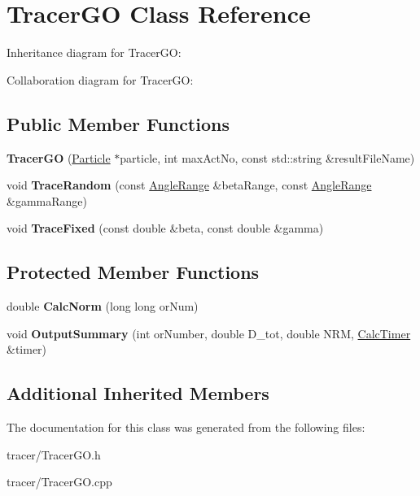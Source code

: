 \hypertarget{class_tracer_g_o}{}\section{Tracer\+GO Class Reference}
\label{class_tracer_g_o}


Inheritance diagram for Tracer\+GO\+:


Collaboration diagram for Tracer\+GO\+:
\subsection*{Public Member Functions}
\begin{DoxyCompactItemize}
\item 
\mbox{\label{class_tracer_g_o_abe9530e32399e92b297868a133787109}} 
{\bfseries Tracer\+GO} (\mbox{\hyperlink{class_particle}{Particle}} $\ast$particle, int max\+Act\+No, const std\+::string \&result\+File\+Name)
\item 
\mbox{\label{class_tracer_g_o_a23f4c1a224e17fc620cf7fcef197716f}} 
void {\bfseries Trace\+Random} (const \mbox{\hyperlink{struct_angle_range}{Angle\+Range}} \&beta\+Range, const \mbox{\hyperlink{struct_angle_range}{Angle\+Range}} \&gamma\+Range)
\item 
\mbox{\label{class_tracer_g_o_a85ff51763a379abcc4fa84fba1093ef2}} 
void {\bfseries Trace\+Fixed} (const double \&beta, const double \&gamma)
\end{DoxyCompactItemize}
\subsection*{Protected Member Functions}
\begin{DoxyCompactItemize}
\item 
\mbox{\label{class_tracer_g_o_a61ff6ee937f176142c83b4273dfc8545}} 
double {\bfseries Calc\+Norm} (long long or\+Num)
\item 
\mbox{\label{class_tracer_g_o_a716aa00f03bcfc581ce47f8cca60259f}} 
void {\bfseries Output\+Summary} (int or\+Number, double D\+\_\+tot, double N\+RM, \mbox{\hyperlink{class_calc_timer}{Calc\+Timer}} \&timer)
\end{DoxyCompactItemize}
\subsection*{Additional Inherited Members}


The documentation for this class was generated from the following files\+:\begin{DoxyCompactItemize}
\item 
tracer/Tracer\+G\+O.\+h\item 
tracer/Tracer\+G\+O.\+cpp\end{DoxyCompactItemize}
